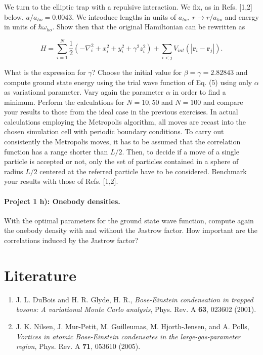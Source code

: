 \documentclass[%
oneside,                 %
final,                   %
10pt]{article}
\begin{document}
We turn to the elliptic trap with a repulsive
   interaction.  We fix, as in Refs. [1,2] below,
   $a/a_{ho}=0.0043$. We introduce lengths in units of $a_{ho}$,
   $r\rightarrow r/a_{ho}$ and energy in units of $\hbar\omega_{ho}$.
   Show then that the original Hamiltonian can be rewritten as

\begin{equation*} 
    H=\sum_{i=1}^N\frac{1}{2}\left(-\nabla^2_i+x_i^2+y_i^2+\gamma^2z_i^2\right)+\sum_{i<j}V_{int}(|\mathbf{r}_i-\mathbf{r}_j|).
 \end{equation*}

What is the expression for $\gamma$?  Choose the initial value for
 $\beta=\gamma = 2.82843$ and compute 
 ground state energy using the trial wave function of
 Eq. (5)  using only $\alpha$ as variational
 parameter.  Vary again the parameter
 $\alpha$ in order to find a minimum.
 Perform the calculations for
 $N=10,50$ and $N=100$ and compare your results to those from the
 ideal case in the previous exercises.  In actual calculations
 employing the Metropolis algorithm, all moves are recast into the
 chosen simulation cell with periodic boundary conditions. To carry
 out consistently the Metropolis moves, it has to be assumed that the
 correlation function has a range shorter than $L/2$. Then, to decide
 if a move of a single particle is accepted or not, only the set of
 particles contained in a sphere of radius $L/2$ centered at the
 referred particle have to be considered.  Benchmark your results with
 those of Refs. [1,2].

\paragraph{Project 1 h): Onebody densities.}
With the optimal parameters for the ground state wave function,
compute again the onebody density with and without the Jastrow factor.
How important are the correlations induced by the Jastrow factor?

\section{Literature}

\begin{enumerate}
 \item J. L. DuBois and H. R. Glyde, H. R., \emph{Bose-Einstein condensation in trapped bosons: A variational Monte Carlo analysis}, Phys. Rev. A \textbf{63}, 023602 (2001).

 \item J. K. Nilsen,  J. Mur-Petit, M. Guilleumas, M. Hjorth-Jensen, and A. Polls, \emph{Vortices in atomic Bose-Einstein condensates in the large-gas-parameter region}, Phys. Rev. A \textbf{71}, 053610 (2005).
\end{enumerate}
\end{document}
